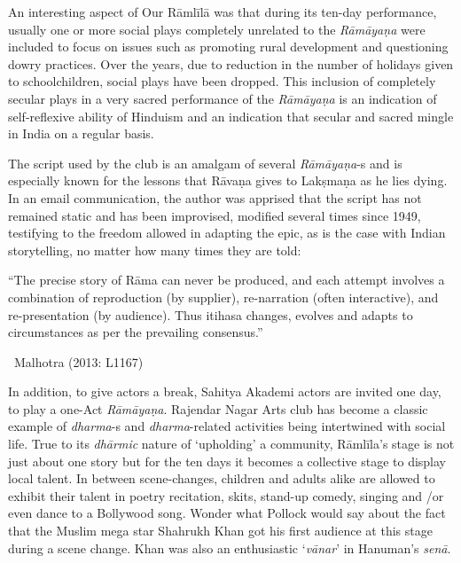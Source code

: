 An interesting aspect of Our Rāmlīlā was that during its ten-day performance, usually one or more social plays completely unrelated to the \textit{Rāmāyaṇa} were included to focus on issues such as promoting rural development and questioning dowry practices. Over the years, due to reduction in the number of holidays given to schoolchildren, social plays have been dropped. This inclusion of completely secular plays in a very sacred performance of the \textit{Rāmāyaṇa} is an indication of self-reflexive ability of Hinduism and an indication that secular and sacred mingle in India on a regular basis.

The script used by the club is an amalgam of several \textit{Rāmāyaṇa}-s and is especially known for the lessons that Rāvaṇa gives to Lakṣmaṇa as he lies dying. In an email communication, the author was apprised that the script has not remained static and has been improvised, modified several times since 1949, testifying to the freedom allowed in adapting the epic, as is the case with Indian storytelling, no matter how many times they are told:

\begin{myquote}
“The precise story of Rāma can never be produced, and each attempt involves a combination of reproduction (by supplier), re-narration (often interactive), and re-presentation (by audience). Thus itihasa changes, evolves and adapts to circumstances as per the prevailing consensus.”

~\hfill Malhotra (2013: L1167)
\end{myquote}

In addition, to give actors a break, Sahitya Akademi actors are invited one day, to play a one-Act \textit{Rāmāyaṇa}. Rajendar Nagar Arts club has become a classic example of \textit{dharma}-s and \textit{dharma}-related activities being intertwined with social life. True to its \textit{dhārmic} nature of ‘upholding’ a community, Rāmlīla’s stage is not just about one story but for the ten days it becomes a collective stage to display local talent. In between scene-changes, children and adults alike are allowed to exhibit their talent in poetry recitation, skits, stand-up comedy, singing and /or even dance to a Bollywood song. Wonder what Pollock would say about the fact that the Muslim mega star Shahrukh Khan got his first audience at this stage during a scene change. Khan was also an enthusiastic ‘\textit{vānar}’ in Hanuman’s \textit{senā}.

